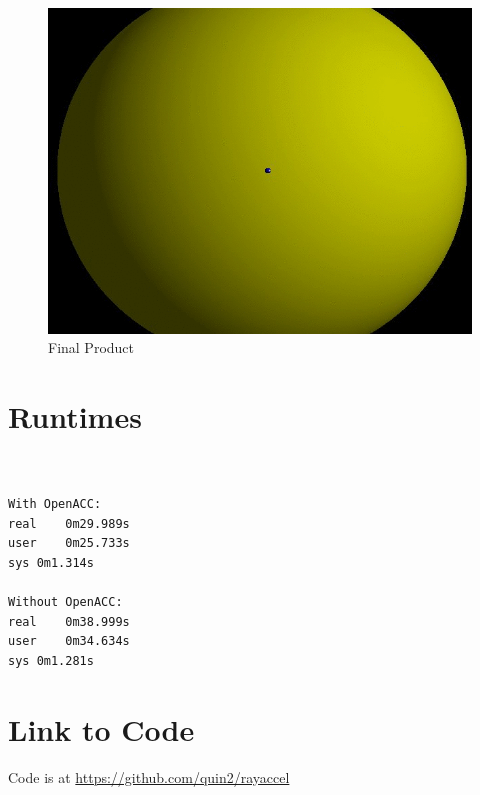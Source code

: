 \documentclass{article}
\begin{document}
\begin{figure}
    \centering
    \includegraphics[width=.9\columnwidth]{quinn_fig2.png}
    \caption{Final Product}
    \label{fig:my_label}
\end{figure}

\section{Runtimes}
\begin{verbatim}


With OpenACC:
real	0m29.989s
user	0m25.733s
sys	0m1.314s

Without OpenACC:
real	0m38.999s
user	0m34.634s
sys	0m1.281s
\end{verbatim}


%  





\section{Link to Code}
Code is at \href{https://github.com/quin2/rayaccel}{https://github.com/quin2/rayaccel}
\end{document}
